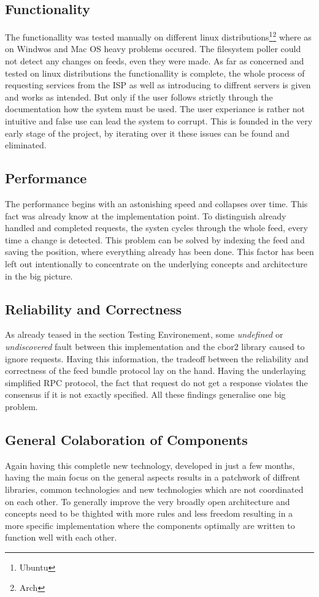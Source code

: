 \subsection{Functionality}
The functionallity was tested manually on different linux distributions\footnote{Ubuntu}\footnote{Arch} where as on Windwos and Mac OS heavy problems occured. The filesystem poller could not detect any changes on feeds, even they were made. As far as concerned and tested on linux distributions the functionallity is complete, the whole process of requesting services from the ISP as well as introducing to diffrent servers is given and works as intended. But only if the user follows strictly through the documentation how the system must be used. The user experiance is rather not intuitive and false use can lead the system to corrupt. This is founded in the very early stage of the project, by iterating over it these issues can be found and eliminated.
\subsection{Performance}
The performance begins with an astonishing speed and collapses over time. This fact was already know at the implementation point. To distinguish already handled and completed requests, the systen cycles through the whole feed, every time a change is detected. This problem can be solved by indexing the feed and saving the position, where everything already has been done. This factor has been left out intentionally to concentrate on the underlying concepts and architecture in the big picture.
\subsection{Reliability and Correctness}
As already teased in the section Testing Environement, some \textit{undefined} or \textit{undiscovered} fault between this implementation and the cbor2 library caused to ignore requests. Having this information, the tradeoff between the reliability and correctness of the feed bundle protocol lay on the hand. Having the underlaying simplified RPC protocol, the fact that request do not get a response violates the consensus if it is not exactly specified. All these findings generalise one big problem. 

\subsection{General Colaboration of Components}
Again having this completle new technology, developed in just a few months, having the main focus on the general aspects results in a patchwork of diffrent libraries, common technologies and new technologies which are not coordinated on each other. To generally improve the very broadly open architecture and concepts need to be thighted with more rules and less freedom resulting in a more specific implementation where the components optimally are written to function well with each other.